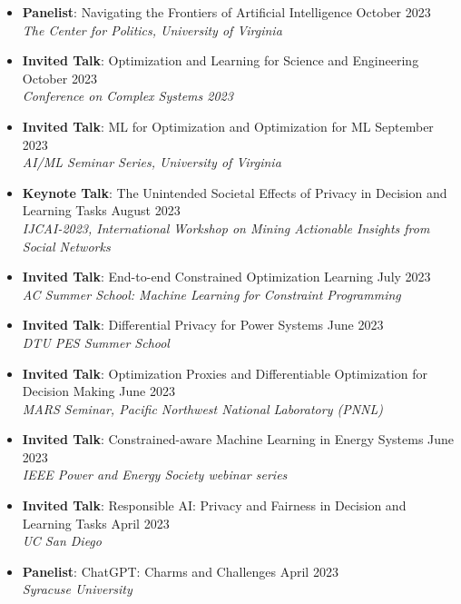 \begin{itemize}
  \item {\bf Panelist}: {Navigating the Frontiers of Artificial Intelligence} \hfill{October 2023}\\
  {\em  The Center for Politics, University of Virginia}

  \item {\bf Invited Talk}: {Optimization and Learning for Science and Engineering} \hfill{October 2023}\\
  {\em  Conference on Complex Systems 2023}

  \item {\bf Invited Talk}: {ML for Optimization and Optimization for ML} \hfill{September 2023}\\
  {\em  AI/ML Seminar Series, University of Virginia}

  \item {\bf Keynote Talk}: {The Unintended Societal Effects of Privacy in Decision and Learning Tasks} \hfill{August 2023}\\
  {\em  IJCAI-2023, International Workshop on Mining Actionable Insights from Social Networks}

  \item {\bf Invited Talk}: {End-to-end Constrained Optimization Learning} \hfill{July 2023}\\
  {\em  AC Summer School: Machine Learning for Constraint Programming}

  \item {\bf Invited Talk}: {Differential Privacy for Power Systems} \hfill{June 2023}\\
  {\em  DTU PES Summer School}

  \item {\bf Invited Talk}: {Optimization Proxies and Differentiable Optimization for Decision Making} \hfill{June 2023}\\
  {\em  MARS Seminar, Pacific Northwest National Laboratory (PNNL)}

  \item {\bf Invited Talk}: {Constrained-aware Machine Learning in Energy Systems} \hfill{June 2023}\\
  {\em  IEEE Power and Energy Society webinar series}

  \item {\bf Invited Talk}: {Responsible AI: Privacy and Fairness in Decision and Learning Tasks} \hfill{April 2023}\\
  {\em  UC San Diego}

  \item {\bf Panelist}: {ChatGPT: Charms and Challenges} \hfill{April 2023}\\
  {\em  Syracuse University}


\end{itemize}
